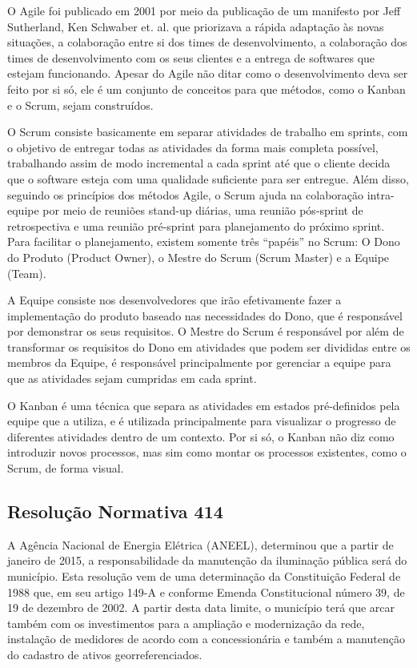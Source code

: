 \documentclass[
	article,			%
	11pt,				%
	oneside,			%
	a4paper,			%
	english,			%
	brazil,				%
	sumario=tradicional
	]{abntex2}
\begin{document}
O Agile foi publicado em 2001 por meio da publicação de um manifesto por Jeff Sutherland, Ken Schwaber et. al. que priorizava a rápida adaptação às novas situações, a colaboração entre si dos times de desenvolvimento, a colaboração dos times de desenvolvimento com os seus clientes e a entrega de softwares que estejam funcionando. \cite{agilemanifesto}
Apesar do Agile não ditar como o desenvolvimento deva ser feito por si só, ele é um conjunto de conceitos para que métodos, como o Kanban e o Scrum, sejam construídos.

O Scrum consiste basicamente em separar atividades de trabalho em sprints, com o objetivo de entregar todas as atividades da forma mais completa possível, trabalhando assim de modo incremental a cada sprint até que o cliente decida que o software esteja com uma qualidade suficiente para ser entregue.
Além disso, seguindo os princípios dos métodos Agile, o Scrum ajuda na colaboração intra-equipe por meio de reuniões stand-up diárias, uma reunião pós-sprint de retrospectiva e uma reunião pré-sprint para planejamento do próximo sprint.
Para facilitar o planejamento, existem somente três “papéis” no Scrum: O Dono do Produto (Product Owner), o Mestre do Scrum (Scrum Master) e a Equipe (Team).

A Equipe consiste nos desenvolvedores que irão efetivamente fazer a implementação do produto baseado nas necessidades do Dono, que é responsável por demonstrar os seus requisitos.
O Mestre do Scrum é responsável por além de transformar os requisitos do Dono em atividades que podem ser divididas entre os membros da Equipe, é responsável principalmente por gerenciar a equipe para que as atividades sejam cumpridas em cada sprint. \cite{scrum}

O Kanban é uma técnica que separa as atividades em estados pré-definidos pela equipe que a utiliza, e é utilizada principalmente para visualizar o progresso de diferentes atividades dentro de um contexto.
Por si só, o Kanban não diz como introduzir novos processos, mas sim como montar os processos existentes, como o Scrum, de forma visual.

\subsection{Resolução Normativa 414}

A Agência Nacional de Energia Elétrica (ANEEL), determinou que a partir de janeiro de 2015, a responsabilidade da manutenção da iluminação pública será do município.
Esta resolução vem de uma determinação da Constituição Federal de 1988 que, em seu artigo 149-A e conforme Emenda Constitucional número 39, de 19 de dezembro de 2002.
A partir desta data limite, o município terá que arcar também com os investimentos para a ampliação e modernização da rede, instalação de medidores de acordo com a concessionária e também a manutenção do cadastro de ativos georreferenciados. \cite{aneel414}
\end{document}
